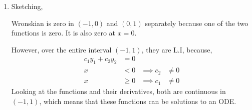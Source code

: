 \begin{enumerate}
\begin{enumerate}
              \item Sketching,
                    \begin{figure}[H]
                        \centering
                    \end{figure}
                    Wronskian is zero in $ (-1,0) $ and $ (0, 1) $ separately because
                    one of the two functions is zero.
                    It is also zero at $ x = 0 $. \par
                    However, over the entire interval $ (-1, 1) $, they are L.I, because,
                    \begin{align}
                        c_{1}y_{1} + c_{2}y_{2} & = 0                               \\
                        x                       & < 0    & \implies  c_{2} & \neq 0 \\
                        x                       & \geq 0 & \implies  c_{1} & \neq 0
                    \end{align}
                    Looking at the functions and their derivatives, both are continuous
                    in $ (-1, 1) $, which means that these functions can be solutions
                    to an ODE. \par

\end{enumerate}
\end{enumerate}
